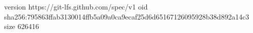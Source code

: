 version https://git-lfs.github.com/spec/v1
oid sha256:795863ffab3130014ffb5a09a0ca9ecaf25d6d65167126095928b38d892a14c3
size 626416
